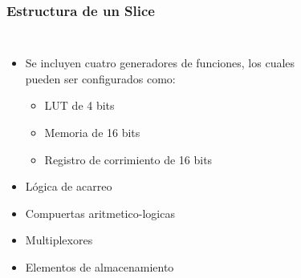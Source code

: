 \frame
{
  \frametitle{Estructura de un Slice}
 	\begin{columns}
		\begin{itemize}
			\item Se incluyen cuatro generadores de funciones, los cuales pueden ser configurados como: %
			
			\begin{itemize}
				\item LUT de 4 bits %
				\item Memoria de 16 bits  %
				\item Registro de corrimiento de 16 bits %
			\end{itemize}
			\item L\'ogica de acarreo %
			\item Compuertas aritmetico-logicas %
			\item Multiplexores
			\item Elementos de almacenamiento %
		\end{itemize}  
	   \begin{center}
			\begin{figure}      
		 \end{figure}	
		 \end{center}
  
  \end{columns}
   
 }
 


